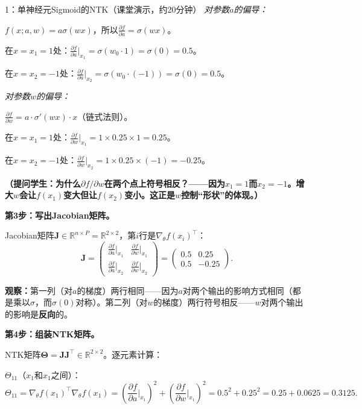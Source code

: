\documentclass[11pt,a4paper]{article}
\newcommand{\R}{\mathbb{R}}
\newcommand{\bTheta}{\boldsymbol{\Theta}}
\newcommand{\bJ}{\mathbf{J}}
\begin{document}
\begin{handcalc}{1：单神经元Sigmoid的NTK（课堂演示，约20分钟）}
\medskip
\textit{对参数$a$的偏导：}

$f(x;a,w) = a\sigma(wx)$，所以$\frac{\partial f}{\partial a} = \sigma(wx)$。

在$x=x_1=1$处：$\frac{\partial f}{\partial a}\big|_{x_1} = \sigma(w_0\cdot 1) = \sigma(0) = 0.5$。

在$x=x_2=-1$处：$\frac{\partial f}{\partial a}\big|_{x_2} = \sigma(w_0\cdot(-1)) = \sigma(0) = 0.5$。

\medskip
\textit{对参数$w$的偏导：}

$\frac{\partial f}{\partial w} = a\cdot\sigma'(wx)\cdot x$（链式法则）。

在$x=x_1=1$处：$\frac{\partial f}{\partial w}\big|_{x_1} = 1\times 0.25\times 1 = 0.25$。

在$x=x_2=-1$处：$\frac{\partial f}{\partial w}\big|_{x_2} = 1\times 0.25\times(-1) = -0.25$。

\textbf{（提问学生：为什么$\partial f/\partial w$在两个点上符号相反？——因为$x_1=1$而$x_2=-1$。增大$w$会让$f(x_1)$变大但让$f(x_2)$变小。这正是$w$控制``形状''的体现。）}

\bigskip
\textbf{第3步：写出Jacobian矩阵。}

Jacobian矩阵$\bJ\in\R^{n\times P} = \R^{2\times 2}$，第$i$行是$\nabla_\theta f(x_i)^\top$：
\[
\bJ = \begin{pmatrix}
\frac{\partial f}{\partial a}\big|_{x_1} & \frac{\partial f}{\partial w}\big|_{x_1} \\[6pt]
\frac{\partial f}{\partial a}\big|_{x_2} & \frac{\partial f}{\partial w}\big|_{x_2}
\end{pmatrix}
= \begin{pmatrix}
0.5 & 0.25 \\[4pt]
0.5 & -0.25
\end{pmatrix}.
\]

\textbf{观察：}第一列（对$a$的梯度）两行相同——因为$a$对两个输出的影响方式相同（都是乘以$\sigma$，而$\sigma(0)$对称）。第二列（对$w$的梯度）两行符号相反——$w$对两个输出的影响是\textbf{反向}的。

\bigskip
\textbf{第4步：组装NTK矩阵。}

NTK矩阵$\bTheta = \bJ\bJ^\top \in \R^{2\times 2}$。逐元素计算：

$\Theta_{11}$（$x_1$和$x_1$之间）：
\[
\Theta_{11} = \nabla_\theta f(x_1)^\top\nabla_\theta f(x_1) = \left(\frac{\partial f}{\partial a}\bigg|_{x_1}\right)^2 + \left(\frac{\partial f}{\partial w}\bigg|_{x_1}\right)^2 = 0.5^2 + 0.25^2 = 0.25 + 0.0625 = 0.3125.
\]


\end{handcalc}
\end{document}

